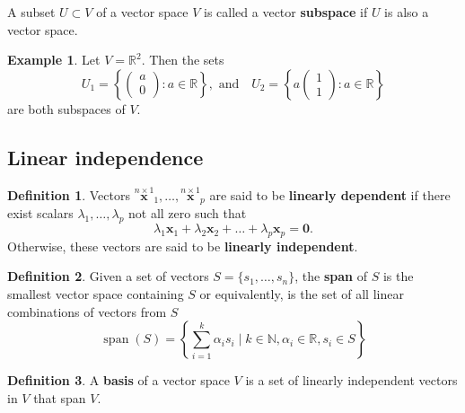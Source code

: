 \documentclass[
]{book}
\theoremstyle{definition}
\newtheorem{definition}{Definition}[chapter]
\theoremstyle{definition}
\newtheorem{example}{Example}[chapter]
\theoremstyle{definition}
\theoremstyle{definition}
\theoremstyle{remark}
\begin{document}
A subset \(U \subset V\) of a vector space \(V\) is called a vector \textbf{subspace} if \(U\) is also a vector space.

\begin{example}
\protect\hypertarget{exm:Rp2}{}{\label{exm:Rp2} }Let \(V=\mathbb{R}^2\). Then the sets \[U_1 = \left\{\left(
        \begin{array}{c}
        a\\
      0  \end{array}
        \right): a\in \mathbb{R}\right\}, \mbox{ and}\quad U_2 = \left\{a\left(
        \begin{array}{c}
       1 \\
      1  \end{array}
        \right): a\in \mathbb{R}\right\}\]
are both subspaces of \(V\).
\end{example}

\hypertarget{linear-independence}{%
\subsection{Linear independence}\label{linear-independence}}

\begin{definition}
\protect\hypertarget{def:linindep}{}{\label{def:linindep} }Vectors \(\stackrel{n\times 1}{\mathbf x}_1 ,\dots , \stackrel{n\times 1}{\mathbf x}_p\)
are said to be \textbf{linearly dependent} if there exist scalars
\(\lambda _1, \dots ,\lambda _p\) not all zero such that
\[ \lambda _1 {\mathbf x}_1+\lambda _2 {\mathbf x}_2+ \dots + \lambda _p {\mathbf x}_p={\mathbf 0}.\]
Otherwise, these vectors are said to be \textbf{linearly independent}.
\end{definition}

\begin{definition}
\protect\hypertarget{def:span}{}{\label{def:span} }Given a set of vectors \(S=\{s_1, \ldots, s_n\}\), the \textbf{span} of \(S\) is the smallest vector space containing \(S\) or equivalently, is the set of all linear combinations of vectors from \(S\)
\[\operatorname{span}(S) = \left\{ \sum_{i=1}^k \alpha_i s_i \mid k \in \mathbb{N}, \alpha_i \in \mathbb{R}, s_i \in S\right\}\]
\end{definition}

\begin{definition}
\protect\hypertarget{def:basis}{}{\label{def:basis} }A \textbf{basis} of a vector space \(V\) is a set of linearly independent vectors in \(V\) that span \(V\).
\end{definition}
\end{document}
